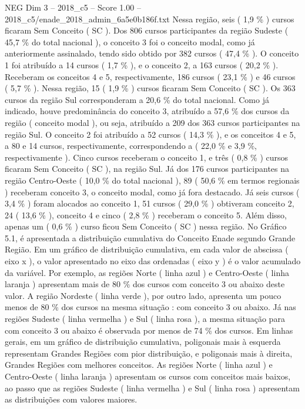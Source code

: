 \begin{textsample}{NEG Dim 3 – 2018\_c5 – Score 1.00 – 2018\_c5/enade\_2018\_admin\_6a5e0b186f.txt}
Nessa região, seis ( 1,9 \% ) cursos ficaram Sem Conceito ( SC ).
Dos 806 cursos participantes da região Sudeste ( 45,7 \% do total nacional ), o conceito 3 foi o conceito modal, como já anteriormente assinalado, tendo sido obtido por 382 cursos ( 47,4 \% ).
O conceito 1 foi atribuído a 14 cursos ( 1,7 \% ), e o conceito 2, a 163 cursos ( 20,2 \% ).
Receberam os conceitos 4 e 5, respectivamente, 186 cursos ( 23,1 \% ) e 46 cursos ( 5,7 \% ).
Nessa região, 15 ( 1,9 \% ) cursos ficaram Sem Conceito ( SC ).
Os 363 cursos da região Sul corresponderam a 20,6 \% do total nacional.
Como já indicado, houve predominância do conceito 3, atribuído a 57,6 \% dos cursos da região ( conceito modal ), ou seja, atribuído a 209 dos 363 cursos participantes na região Sul.
O conceito 2 foi atribuído a 52 cursos ( 14,3 \% ), e os conceitos 4 e 5, a 80 e 14 cursos, respectivamente, correspondendo a ( 22,0 \% e 3,9 \%, respectivamente ).
Cinco cursos receberam o conceito 1, e três ( 0,8 \% ) cursos ficaram Sem Conceito ( SC ), na região Sul.
Já dos 176 cursos participantes na região Centro-Oeste ( 10,0 \% do total nacional ), 89 ( 50,6 \% em termos regionais ) receberam conceito 3, o conceito modal, como já fora destacado.
Já seis cursos ( 3,4 \% ) foram alocados ao conceito 1, 51 cursos ( 29,0 \% ) obtiveram conceito 2, 24 ( 13,6 \% ), conceito 4 e cinco ( 2,8 \% ) receberam o conceito 5.
Além disso, apenas um ( 0,6 \% ) curso ficou Sem Conceito ( SC ) nessa região.
No Gráfico 5.1, é apresentada a distribuição cumulativa do Conceito Enade segundo Grande Região.
Em um gráfico de distribuição cumulativa, em cada valor de abscissa ( eixo x ), o valor apresentado no eixo das ordenadas ( eixo y ) é o valor acumulado da variável.
Por exemplo, as regiões Norte ( linha azul ) e Centro-Oeste ( linha laranja ) apresentam mais de 80 \% dos cursos com conceito 3 ou abaixo deste valor.
A região Nordeste ( linha verde ), por outro lado, apresenta um pouco menos de 80 \% dos cursos na mesma situação : com conceito 3 ou abaixo.
Já nas regiões Sudeste ( linha vermelha ) e Sul ( linha rosa ), a mesma situação para com conceito 3 ou abaixo é observada por menos de 74 \% dos cursos.
Em linhas gerais, em um gráfico de distribuição cumulativa, poligonais mais à esquerda representam Grandes Regiões com pior distribuição, e poligonais mais à direita, Grandes Regiões com melhores conceitos.
As regiões Norte ( linha azul ) e Centro-Oeste ( linha laranja ) apresentam os cursos com conceitos mais baixos, ao passo que as regiões Sudeste ( linha vermelha ) e Sul ( linha rosa ) apresentam as distribuições com valores maiores.

\end{textsample}
